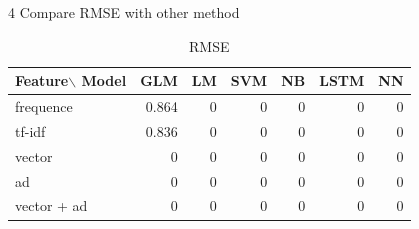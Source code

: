 \documentclass[10pt]{beamer}
\begin{document}
\begin{frame}{4 Compare RMSE with other method}

\begin{table}[]
\centering
\caption*{\huge{RMSE}}

\begin{tabular}{lrrrrrr}
Feature$\backslash$ Model & GLM   & LM & SVM & NB & LSTM & NN \\
\hline
frequence     & 0.864 & 0  & 0   & 0  & 0    & 0  \\
tf-idf        & 0.836 & 0  & 0   & 0  & 0    & 0  \\
vector        & 0     & 0  & 0   & 0  & 0    & 0  \\
ad            & 0     & 0  & 0   & 0  & 0    & 0  \\
vector + ad   & 0     & 0  & 0   & 0  & 0    & 0 \\
\hline
\end{tabular}
\label{table:nonlin} 
\end{table}

\end{frame}
\end{document}
